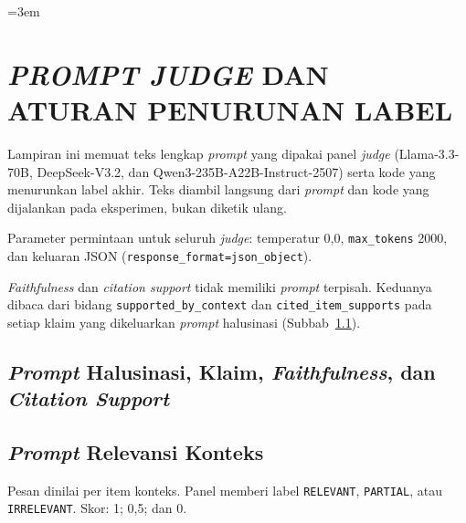 \emergencystretch=3em

\cleardoublepage
\chapter{\textit{PROMPT JUDGE} DAN ATURAN PENURUNAN LABEL}
\label{lamp:prompt-judge}

Lampiran ini memuat teks lengkap \emph{prompt} yang dipakai panel \emph{judge} (Llama-3.3-70B, DeepSeek-V3.2, dan Qwen3-235B-A22B-Instruct-2507) serta kode yang menurunkan label akhir. Teks diambil langsung dari \emph{prompt} dan kode yang dijalankan pada eksperimen, bukan diketik ulang.

Parameter permintaan untuk seluruh \emph{judge}: temperatur 0,0, \texttt{max\_tokens} 2000, dan keluaran JSON (\texttt{response\_\allowbreak{}format=\allowbreak{}json\_\allowbreak{}object}).

\emph{Faithfulness} dan \emph{citation support} tidak memiliki \emph{prompt} terpisah. Keduanya dibaca dari bidang \texttt{supported\_\allowbreak{}by\_\allowbreak{}context} dan \texttt{cited\_\allowbreak{}item\_\allowbreak{}supports} pada setiap klaim yang dikeluarkan \emph{prompt} halusinasi (Subbab~\ref{subsec:lamp-a1}).


\section{\emph{Prompt} Halusinasi, Klaim, \emph{Faithfulness}, dan \emph{Citation Support}}
\label{subsec:lamp-a1}





\section{\emph{Prompt} Relevansi Konteks}
\label{subsec:lamp-a2}

Pesan dinilai per item konteks. Panel memberi label \texttt{RELEVANT}, \texttt{PARTIAL}, atau \texttt{IRRELEVANT}. Skor: 1; 0,5; dan 0.


